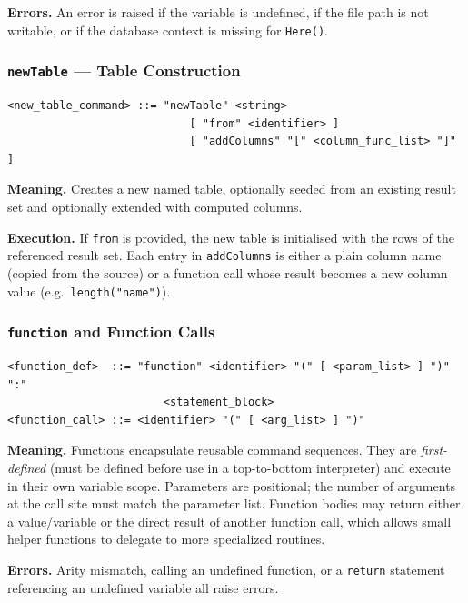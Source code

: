 \begin{itemize}[label=-, noitemsep]
\begin{itemize}[label=-, noitemsep]
\begin{itemize}[label=-, noitemsep]
\begin{itemize}[label=-, noitemsep]
\textbf{Errors.} An error is raised if the variable is undefined, if the
file path is not writable, or if the database context is missing for
\texttt{Here()}.

\subsubsection{\texttt{newTable} --- Table Construction}

\begin{lstlisting}[style=bnf]
<new_table_command> ::= "newTable" <string>
                            [ "from" <identifier> ]
                            [ "addColumns" "[" <column_func_list> "]" ]
\end{lstlisting}

\textbf{Meaning.} Creates a new named table, optionally seeded from an
existing result set and optionally extended with computed columns.

\textbf{Execution.} If \texttt{from} is provided, the new table is initialised
with the rows of the referenced result set. Each entry in \texttt{addColumns}
is either a plain column name (copied from the source) or a function call
whose result becomes a new column value (e.g.\ \texttt{length("name")}).

\subsubsection{\texttt{function} and Function Calls}

\begin{lstlisting}[style=bnf]
<function_def>  ::= "function" <identifier> "(" [ <param_list> ] ")" ":"
                        <statement_block>
<function_call> ::= <identifier> "(" [ <arg_list> ] ")"
\end{lstlisting}

\textbf{Meaning.} Functions encapsulate reusable command sequences. They are
\emph{first-defined} (must be defined before use in a top-to-bottom
interpreter) and execute in their own variable scope. Parameters are
positional; the number of arguments at the call site must match the parameter
list. Function bodies may return either a value/variable or the direct result
of another function call, which allows small helper functions to delegate to
more specialized routines.

\textbf{Errors.} Arity mismatch, calling an undefined function, or a
\texttt{return} statement referencing an undefined variable all raise errors.


\end{itemize}
\end{itemize}
\end{itemize}
\end{itemize}
